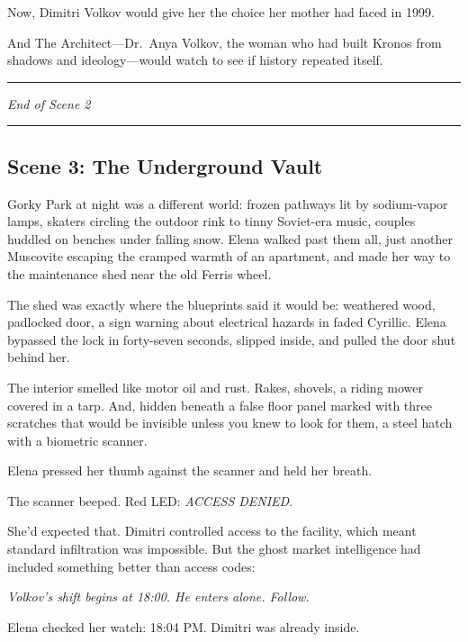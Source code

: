 \documentclass[12pt,letterpaper]{book}
\begin{document}
Now, Dimitri Volkov would give her the choice her mother had faced in 1999.

And The Architect---Dr.~Anya Volkov, the woman who had built Kronos from shadows and ideology---would watch to see if history repeated itself.

\begin{center}\rule{0.5\linewidth}{0.5pt}\end{center}

\emph{End of Scene 2}

\begin{center}\rule{0.5\linewidth}{0.5pt}\end{center}

\hypertarget{scene-3-the-underground-vault}{%
\subsection{Scene 3: The Underground Vault}\label{scene-3-the-underground-vault}}

Gorky Park at night was a different world: frozen pathways lit by sodium-vapor lamps, skaters circling the outdoor rink to tinny Soviet-era music, couples huddled on benches under falling snow. Elena walked past them all, just another Muscovite escaping the cramped warmth of an apartment, and made her way to the maintenance shed near the old Ferris wheel.

The shed was exactly where the blueprints said it would be: weathered wood, padlocked door, a sign warning about electrical hazards in faded Cyrillic. Elena bypassed the lock in forty-seven seconds, slipped inside, and pulled the door shut behind her.

The interior smelled like motor oil and rust. Rakes, shovels, a riding mower covered in a tarp. And, hidden beneath a false floor panel marked with three scratches that would be invisible unless you knew to look for them, a steel hatch with a biometric scanner.

Elena pressed her thumb against the scanner and held her breath.

The scanner beeped. Red LED: \emph{ACCESS DENIED}.

She'd expected that. Dimitri controlled access to the facility, which meant standard infiltration was impossible. But the ghost market intelligence had included something better than access codes:

\emph{Volkov's shift begins at 18:00. He enters alone. Follow.}

Elena checked her watch: 18:04 PM. Dimitri was already inside.
\end{document}
